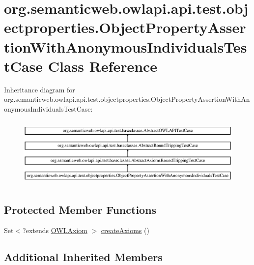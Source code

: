 \hypertarget{classorg_1_1semanticweb_1_1owlapi_1_1api_1_1test_1_1objectproperties_1_1_object_property_assertifae0c5126ce01c483d2a76c42e79dfcf}{\section{org.\-semanticweb.\-owlapi.\-api.\-test.\-objectproperties.\-Object\-Property\-Assertion\-With\-Anonymous\-Individuals\-Test\-Case Class Reference}
\label{classorg_1_1semanticweb_1_1owlapi_1_1api_1_1test_1_1objectproperties_1_1_object_property_assertifae0c5126ce01c483d2a76c42e79dfcf}
}
Inheritance diagram for org.\-semanticweb.\-owlapi.\-api.\-test.\-objectproperties.\-Object\-Property\-Assertion\-With\-Anonymous\-Individuals\-Test\-Case\-:\begin{figure}[H]
\begin{center}
\leavevmode
\includegraphics[height=3.505477cm]{classorg_1_1semanticweb_1_1owlapi_1_1api_1_1test_1_1objectproperties_1_1_object_property_assertifae0c5126ce01c483d2a76c42e79dfcf}
\end{center}
\end{figure}
\subsection*{Protected Member Functions}
\begin{DoxyCompactItemize}
\item 
Set$<$?extends \hyperlink{interfaceorg_1_1semanticweb_1_1owlapi_1_1model_1_1_o_w_l_axiom}{O\-W\-L\-Axiom} $>$ \hyperlink{classorg_1_1semanticweb_1_1owlapi_1_1api_1_1test_1_1objectproperties_1_1_object_property_assertifae0c5126ce01c483d2a76c42e79dfcf_a10c1a0ec196c0a02b2bbe42ae3a61461}{create\-Axioms} ()
\end{DoxyCompactItemize}
\subsection*{Additional Inherited Members}


